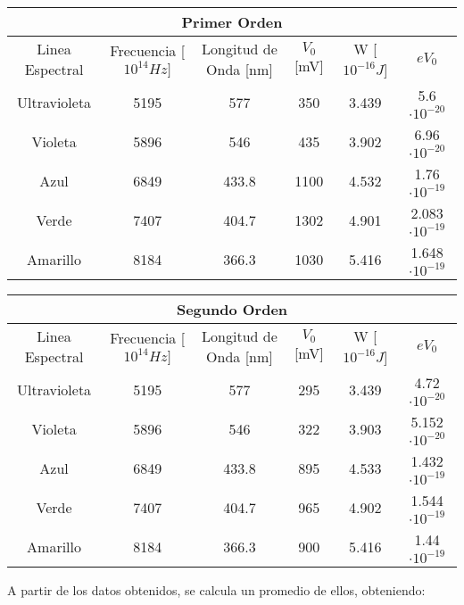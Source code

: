 \documentclass[a4paper,12pt]{report}
\begin{document}
    \begin{table}[htbp!]
        \centering
        \begin{tabular}{|c|c|c|c|c|c|}
        \hline
        \multicolumn{6}{|c|}{Primer Orden} \\
        \hline
        Linea Espectral & Frecuencia [$10^{14} Hz]$ & Longitud de Onda [nm] & $V_0$ [mV]& W [$10^{-16} J$] & $eV_0 $\\
        \hline
        Ultravioleta & 5195 & 577 & 350 & 3.439 & 5.6 $\cdot 10^{-20}$ \\
        \hline
        Violeta & 5896 & 546 & 435 & 3.902 & 6.96 $\cdot 10^{-20}$\\
        \hline
        Azul & 6849 & 433.8 & 1100 & 4.532 & 1.76 $\cdot 10^{-19}$\\
        \hline
        Verde & 7407 & 404.7 & 1302 & 4.901 & 2.083 $\cdot 10^{-19}$\\
        \hline
        Amarillo & 8184 & 366.3 & 1030 & 5.416 & 1.648 $\cdot 10^{-19}$\\
        \hline
        \end{tabular}
    \end{table}

    \begin{table}[htbp!]
        \centering
        \begin{tabular}{|c|c|c|c|c|c|}
        \hline
        \multicolumn{6}{|c|}{Segundo Orden} \\
        \hline
        Linea Espectral & Frecuencia [$10^{14} Hz]$ & Longitud de Onda [nm] & $V_0$ [mV]& W [$10^{-16} J$] & $eV_0 $\\
        \hline
        Ultravioleta & 5195 & 577 & 295 & 3.439 & 4.72 $\cdot 10^{-20}$\\
        \hline
        Violeta & 5896 & 546 & 322 & 3.903 & 5.152 $\cdot 10^{-20}$\\
        \hline
        Azul & 6849 & 433.8 & 895 & 4.533 & 1.432 $\cdot 10^{-19}$\\
        \hline
        Verde & 7407 & 404.7 & 965 & 4.902 & 1.544 $\cdot 10^{-19}$\\
        \hline
        Amarillo & 8184 & 366.3 & 900 & 5.416 & 1.44 $\cdot 10^{-19}$\\
        \hline
        \end{tabular}
    \end{table}

    A partir de los datos obtenidos, se calcula un promedio de ellos, obteniendo:
\end{document}
